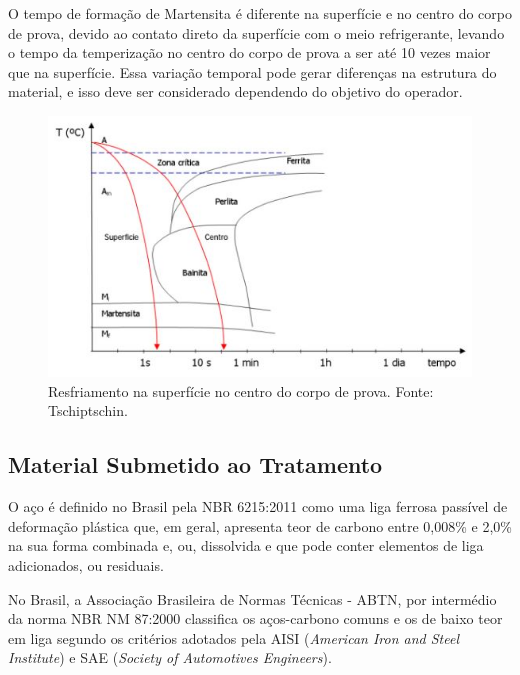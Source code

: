 O tempo de formação de Martensita é diferente na superfície e no centro do corpo de prova, devido ao contato direto da superfície com o meio refrigerante, levando o tempo da temperização no centro do corpo de prova a ser até 10 vezes maior que na superfície. Essa variação temporal pode gerar diferenças na estrutura do material, e isso deve ser considerado dependendo do objetivo do operador.

\begin{figure}[H]
	\centering
	\label{resfriamento2}
	\includegraphics[keepaspectratio=true,scale=0.8]{figuras/resfriamento2.JPG}
	\caption{Resfriamento na superfície no centro do corpo de prova. Fonte: Tschiptschin.}
\end{figure}

\subsection{Material Submetido ao Tratamento}

O aço é definido no Brasil pela NBR 6215:2011 como uma liga ferrosa passível de deformação plástica que, em geral, apresenta teor de carbono entre 0,008\% e 2,0\% na sua forma combinada e, ou, dissolvida e que pode conter elementos de liga adicionados, ou residuais.

No Brasil, a Associação Brasileira de Normas Técnicas - ABTN, por intermédio da norma NBR NM 87:2000 classifica os aços-carbono comuns e os de baixo teor em liga segundo os critérios adotados pela AISI (\textit{American Iron and Steel Institute}) e SAE (\textit{Society of Automotives Engineers}).

